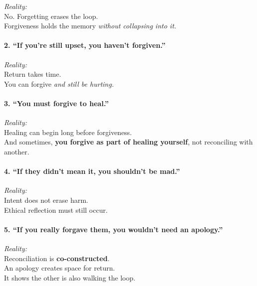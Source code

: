 \emph{Reality:\\
} No. Forgetting erases the loop.\\
Forgiveness holds the memory \emph{without collapsing into it.}

\paragraph{\texorpdfstring{\textbf{2. ``If you're still upset, you
haven't
forgiven.''}}{2. ``If you're still upset, you haven't forgiven.''}}\label{if-youre-still-upset-you-havent-forgiven.}

\emph{Reality:\\
} Return takes time.\\
You can forgive \emph{and still be hurting.}

\paragraph{\texorpdfstring{\textbf{3. ``You must forgive to
heal.''}}{3. ``You must forgive to heal.''}}\label{you-must-forgive-to-heal.}

\emph{Reality:\\
} Healing can begin long before forgiveness.\\
And sometimes, \textbf{you forgive as part of healing yourself}, not
reconciling with another.

\paragraph{\texorpdfstring{\textbf{4. ``If they didn't mean it, you
shouldn't be
mad.''}}{4. ``If they didn't mean it, you shouldn't be mad.''}}\label{if-they-didnt-mean-it-you-shouldnt-be-mad.}

\emph{Reality:\\
} Intent does not erase harm.\\
Ethical reflection must still occur.

\paragraph{\texorpdfstring{\textbf{5. ``If you really forgave them, you
wouldn't need an
apology.''}}{5. ``If you really forgave them, you wouldn't need an apology.''}}\label{if-you-really-forgave-them-you-wouldnt-need-an-apology.}

\emph{Reality:\\
} Reconciliation is \textbf{co-constructed}.\\
An apology creates space for return.\\
It shows the other is also walking the loop.

